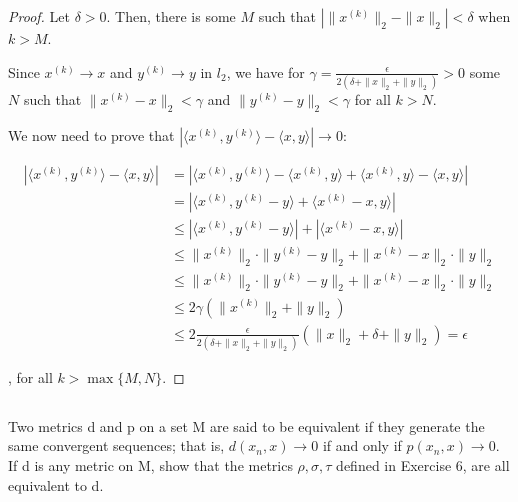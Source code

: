 \begin{proof}

Let $\delta>0$. Then, there is some $M$ such that $|\|x^{(k)}\|_2 - \|x\|_2| < \delta$ when $k>M$.

Since $x^{(k)} \rightarrow x$ and $y^{(k)} \rightarrow y$ in $l_2$, we have for $\gamma = \frac{\epsilon}{2(\delta + \|x\|_2 + \|y\|_2)} > 0$ some $N$ such that $\|x^{(k)} - x\|_2 < \gamma$ and $\|y^{(k)} - y\|_2 < \gamma$ for all $k>N$. 

We now need to prove that $|\langle x^{(k)}, y^{(k)} \rangle - \langle x, y \rangle | \rightarrow 0$:

\begin{equation*}
\begin{split}
|\langle x^{(k)}, y^{(k)} \rangle - \langle x, y \rangle|
&= |\langle x^{(k)}, y^{(k)} \rangle - \langle x^{(k)}, y \rangle + \langle x^{(k)}, y \rangle - \langle x, y \rangle|
\\&
= |\langle x^{(k)}, y^{(k)}  - y \rangle + \langle x^{(k)} - x, y \rangle| \\&
\leq |\langle x^{(k)}, y^{(k)}  - y \rangle| + |\langle x^{(k)} - x, y \rangle|
\\&
\leq \|x^{(k)}\|_2 \cdot \|y^{(k)} - y\|_2 + \|x^{(k)} - x\|_2 \cdot \|y\|_2
\\&
\leq \|x^{(k)}\|_2 \cdot \|y^{(k)} - y\|_2 + \|x^{(k)} - x\|_2 \cdot \|y\|_2
\\&
\leq  2\gamma (\|x^{(k)}\|_2 + \|y\|_2)
\\&
\leq  2\frac{\epsilon}{2(\delta + \|x\|_2 + \|y\|_2)} (\|x\|_2 + \delta + \|y\|_2) = \epsilon 
\end{split}
\end{equation*}

, for all $k>\max\{M, N\}$.






\end{proof}

\subsection{} Two metrics d and p on a set M are said to be equivalent if they generate the same convergent sequences; that is, $d(x_n , x) \rightarrow 0$ if and only if $p(x_n, x) \rightarrow 0$. If d is any metric on M, show that the metrics $\rho, \sigma, \tau$ defined in Exercise 6, are all equivalent to d.


